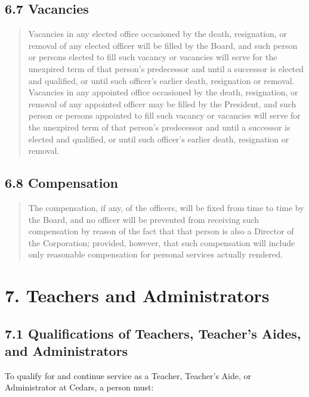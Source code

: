 \documentclass[
]{book}
\begin{document}
\subsection{6.7 Vacancies}\label{vacancies}

\begin{quote}
Vacancies in any elected office occasioned by the death, resignation,
or removal of any elected officer will be filled by the Board, and
such person or persons elected to fill such vacancy or vacancies will
serve for the unexpired term of that person's predecessor and until a
successor is elected and qualified, or until such officer's earlier
death, resignation or removal. Vacancies in any appointed office
occasioned by the death, resignation, or removal of any appointed
officer may be filled by the President, and such person or persons
appointed to fill such vacancy or vacancies will serve for the
unexpired term of that person's predecessor and until a successor is
elected and qualified, or until such officer's earlier death,
resignation or removal.
\end{quote}

\subsection{6.8 Compensation}\label{compensation}

\begin{quote}
The compensation, if any, of the officers, will be fixed from time to
time by the Board, and no officer will be prevented from receiving
such compensation by reason of the fact that that person is also a
Director of the Corporation; provided, however, that such compensation
will include only reasonable compensation for personal services
actually rendered.
\end{quote}

\section{7. Teachers and Administrators}\label{teachers-and-administrators}

\subsection{7.1 Qualifications of Teachers, Teacher's Aides, and Administrators}\label{qualifications-of-teachers-teachers-aides-and-administrators}

To qualify for and continue service as a Teacher, Teacher's Aide, or Administrator at Cedars, a person must:
\end{document}
